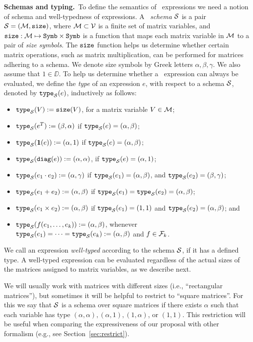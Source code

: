 \smallskip
\noindent
\textbf{Schemas and typing.}\,
To define the semantics of \lang\ expressions we need a notion of schema and well-typedness of expressions. A \lang\ \textit{schema} $\mathcal{S}$ is a pair $\mathcal{S}=(\mathcal{M},\texttt{size})$, where $\mathcal{M}\subset \mathcal{V}$ is a finite set of matrix variables, and $\texttt{size}: \mathcal{M} \mapsto \texttt{Symb}\times \texttt{Symb}$ is a function that maps each matrix variable in $\mathcal{M}$ to a pair of \textit{size symbols}. The $\texttt{size}$ function helps us determine whether certain matrix operations, such as matrix multiplication, can be performed for matrices adhering to a schema. 
We denote size symbols by Greek letters $\alpha,\beta,\gamma$. We also assume that $1\in \DD$. 
To help us determine whether a \lang\ expression can always be evaluated, we define the \textit{type} of an expression $e$, with respect to a schema $\mathcal{S}$, denoted by $\texttt{type}_{\mathcal{S}}(e)$, inductively as follows:
\begin{itemize}
\item $\texttt{type}_{\mathcal{S}}(V):= \texttt{size}(V)$, for a matrix variable $V\in\mathcal{M}$;
\item $\texttt{type}_{\mathcal{S}}(e^T):= (\beta,\alpha)$ if $\texttt{type}_{\mathcal{S}}(e)=(\alpha,\beta)$;
\item $\texttt{type}_{\mathcal{S}}(\mathbf{1}(e)):= (\alpha,1)$ if $\texttt{type}_{\mathcal{S}}(e)=(\alpha,\beta)$;
\item $\texttt{type}_{\mathcal{S}}(\texttt{diag}(e)):= (\alpha,\alpha)$, if $\texttt{type}_{\mathcal{S}}(e)=(\alpha,1)$;
\item $\texttt{type}_{\mathcal{S}}(e_1 \cdot e_2):= (\alpha,\gamma)$ if  $\texttt{type}_{\mathcal{S}}(e_1)=(\alpha,\beta)$, and $\texttt{type}_{\mathcal{S}}(e_2)=(\beta,\gamma)$;
\item $\texttt{type}_{\mathcal{S}}(e_1 + e_2):=(\alpha,\beta)$ if $\texttt{type}_{\mathcal{S}}(e_1)=\texttt{type}_{\mathcal{S}}(e_2)=(\alpha,\beta)$;
\item $\texttt{type}_{\mathcal{S}}(e_1\times e_2):=(\alpha,\beta)$ if $\texttt{type}_{\mathcal{S}}(e_1)=(1,1)$ and $\texttt{type}_{\mathcal{S}}(e_2)=(\alpha,\beta)$; and
\item $\texttt{type}_{\mathcal{S}}(f(e_1,\ldots ,e_k)):= (\alpha,\beta)$, whenever $\texttt{type}_{\mathcal{S}}(e_1) = \cdots = \texttt{type}_{\mathcal{S}}(e_k) := (\alpha,\beta)$ and $f\in\mathcal{F}_k$.
\end{itemize}
 We call an expression \textit{well-typed} according to the schema $\mathcal{S}$, if it has a defined type. 
A well-typed expression can be evaluated regardless of the actual sizes of the matrices assigned to matrix variables, as we describe next.

We will usually work with matrices with different sizes (i.e., ``rectangular matrices''), but sometimes it will be helpful to restrict to ``square matrices''. For this we say that $\mathcal{S}$ is a schema over square matrices if there exists $\alpha$ such that each variable has type $(\alpha,\alpha),(\alpha,1),(1,\alpha)$, or $(1,1)$. This restriction will be useful when comparing the expressiveness of our proposal with other formalism (e.g., see Section~\ref{sec:restrict}). 


